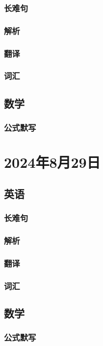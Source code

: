 \documentclass[UTF8]{ctexart}
\begin{document}
\subsubsection{长难句}
\subsubsection{解析}
\subsubsection{翻译}
\subsubsection{词汇}
\subsection{数学}
\subsubsection{公式默写}
\begin{multicols}{2}
\end{multicols}
\section{2024年8月29日}
\subsection{英语}
\subsubsection{长难句}
\subsubsection{解析}
\subsubsection{翻译}
\subsubsection{词汇}
\subsection{数学}
\subsubsection{公式默写}
\begin{multicols}{2}
\end{multicols}
\end{document}
